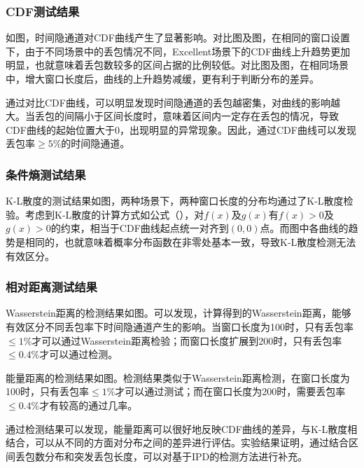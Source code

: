 \subsubsection{CDF测试结果}
\label{chap:analyze:result:window:cdf}

如图，时间隐通道对CDF曲线产生了显著影响。对比图及图，在相同的窗口设置下，由于不同场景中的丢包情况不同，Excellent场景下的CDF曲线上升趋势更加明显，也就意味着丢包数较多的区间占据的比例较低。对比图及图，在相同场景中，增大窗口长度后，曲线的上升趋势减缓，更有利于判断分布的差异。

通过对比CDF曲线，可以明显发现时间隐通道的丢包越密集，对曲线的影响越大。当丢包的间隔小于区间长度时，意味着区间内一定存在丢包的情况，导致CDF曲线的起始位置大于0，出现明显的异常现象。因此，通过CDF曲线可以发现丢包率$\ge5\%$的时间隐通道。

\subsubsection{条件熵测试结果}
\label{chap:analyze:result:window:kld}

K-L散度的测试结果如图，两种场景下，两种窗口长度的分布均通过了K-L散度检验。考虑到K-L散度的计算方式如公式（），对$f(x)$及$g(x)$有$f(x)>0$及$g(x)>0$的约束，相当于CDF曲线起点统一对齐到$(0,0)$点。而图中各曲线的趋势是相同的，也就意味着概率分布函数在非零处基本一致，导致K-L散度检测无法有效区分。

\subsubsection{相对距离测试结果}
\label{chap:analyze:result:window:distance}

Wasserstein距离的检测结果如图。可以发现，计算得到的Wasserstein距离，能够有效区分不同丢包率下时间隐通道产生的影响。当窗口长度为100时，只有丢包率$\le 1\%$才可以通过Wasserstein距离检验；而窗口长度扩展到200时，只有丢包率$\le 0.4\%$才可以通过检测。

能量距离的检测结果如图。检测结果类似于Wasserstein距离检测，在窗口长度为100时，只有丢包率$\le 1\%$才可以通过测试；而在窗口长度为200时，需要丢包率$\le 0.4\%$才有较高的通过几率。

通过检测结果可以发现，能量距离可以很好地反映CDF曲线的差异，与K-L散度相结合，可以从不同的方面对分布之间的差异进行评估。实验结果证明，通过结合区间丢包数分布和突发丢包长度，可以对基于IPD的检测方法进行补充。


